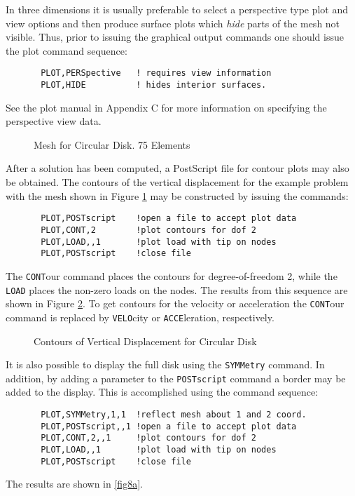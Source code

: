In three dimensions it is
usually preferable to select a perspective type plot and view options
and then produce
surface plots which {\it hide} parts of the mesh not visible.  Thus, prior
to issuing the graphical output
commands one should issue the plot command sequence:
\begin{verbatim}
       PLOT,PERSpective   ! requires view information
       PLOT,HIDE          ! hides interior surfaces.
\end{verbatim}
See the plot manual in Appendix C
for more information on specifying the perspective view data.

\begin{figure}[ht!]
\epsfxsize=2.8in
\centerline {\hfil {} \hfil}
\caption{Mesh for Circular Disk. 75 Elements}
\label{fig7}
\end{figure}

After a solution has been computed, a PostScript file for
contour plots may also be obtained.
The contours of the vertical displacement for the example problem with the
mesh shown in Figure \ref{fig7} may be constructed by issuing the commands:
\begin{verbatim}
       PLOT,POSTscript    !open a file to accept plot data
       PLOT,CONT,2        !plot contours for dof 2
       PLOT,LOAD,,1       !plot load with tip on nodes
       PLOT,POSTscript    !close file
\end{verbatim}
The {\tt CONT}our command places the contours for degree-of-freedom 2, while
the {\tt LOAD} places the non-zero loads on the nodes.
The results from this sequence are shown in Figure \ref{fig8}.
To get contours for the velocity or acceleration the {\tt CONT}our command
is replaced by {\tt VELO}city or {\tt ACCE}leration, respectively.

\begin{figure}
\epsfxsize=4.8in
\centerline {\hfil {} \hfil}
\caption{Contours of Vertical Displacement for Circular Disk}
\label{fig8}
\end{figure}

It is also possible to display the full disk using the {\tt SYMMetry}
command.  In addition, by adding a parameter to the {\tt POSTscript}
command a border may be added to the display.
This is accomplished using the command sequence:
\begin{verbatim}
       PLOT,SYMMetry,1,1  !reflect mesh about 1 and 2 coord.
       PLOT,POSTscript,,1 !open a file to accept plot data
       PLOT,CONT,2,,1     !plot contours for dof 2
       PLOT,LOAD,,1       !plot load with tip on nodes
       PLOT,POSTscript    !close file
\end{verbatim}
The results are shown in \ref{fig8a}.

